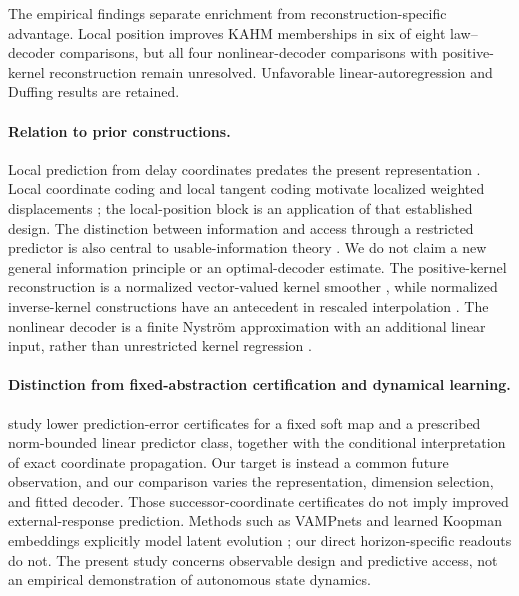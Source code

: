 The empirical findings separate enrichment from reconstruction-specific advantage. Local position improves KAHM memberships in six of eight law--decoder comparisons, but all four nonlinear-decoder comparisons with positive-kernel reconstruction remain unresolved. Unfavorable linear-autoregression and Duffing results are retained.

\paragraph{Relation to prior constructions.}
Local prediction from delay coordinates predates the present representation \citep{Farmer1987Prediction}. Local coordinate coding and local tangent coding motivate localized weighted displacements \citep{Yu2009LCC,Yu2010LTC}; the local-position block is an application of that established design. The distinction between information and access through a restricted predictor is also central to usable-information theory \citep{Xu2020Usable}. We do not claim a new general information principle or an optimal-decoder estimate. The positive-kernel reconstruction is a normalized vector-valued kernel smoother \citep{Nadaraya1964Regression}, while normalized inverse-kernel constructions have an antecedent in rescaled interpolation \citep{DeMarchi2017Rescaled}. The nonlinear decoder is a finite Nystr\"om approximation with an additional linear input, rather than unrestricted kernel regression \citep{Williams2001Nystrom}.

\paragraph{Distinction from fixed-abstraction certification and dynamical learning.}
\citet{KumarKargaran2026Limits} study lower prediction-error certificates for a fixed soft map and a prescribed norm-bounded linear predictor class, together with the conditional interpretation of exact coordinate propagation. Our target is instead a common future observation, and our comparison varies the representation, dimension selection, and fitted decoder. Those successor-coordinate certificates do not imply improved external-response prediction. Methods such as VAMPnets and learned Koopman embeddings explicitly model latent evolution \citep{Mardt2018VAMPnets,Lusch2018Embeddings}; our direct horizon-specific readouts do not. The present study concerns observable design and predictive access, not an empirical demonstration of autonomous state dynamics.

